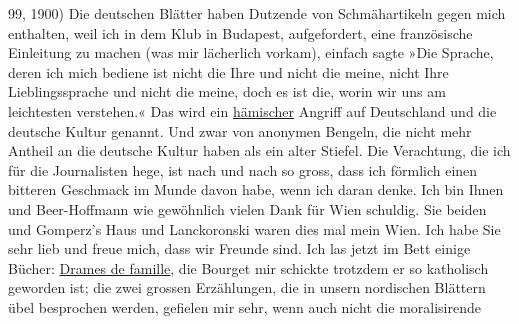 \begin{ledgroupsized}[t]{13cm}
                        99, 1900)\pend
           \pstart
           Die deutschen Blätter haben Dutzende von Schmähartikeln gegen mich enthalten,
                    weil ich in dem Klub
                        in Budapest, aufgefordert, eine französische Einleitung zu machen (was mir lächerlich vorkam),
                    einfach sagte »Die Sprache, deren ich mich bediene ist nicht die Ihre und nicht
                    die meine, nicht Ihre Lieblingssprache und nicht die meine, doch es ist die,
                    worin wir uns am leichtesten verstehen.« Das wird ein \uline{hämischer} Angriff auf Deutschland
                    und die deutsche Kultur genannt. Und zwar von anonymen Bengeln, die nicht mehr
                    Antheil an die deutsche Kultur haben als ein alter Stiefel. Die Verachtung, die ich für die Journalisten {\pb}hege, ist nach und nach so
                    gross, dass ich förmlich einen bitteren Geschmack im Munde davon habe, wenn ich
                    daran denke.\pend
           \pstart
           Ich bin Ihnen und Beer-Hoffmann wie
                    gewöhnlich vielen Dank für Wien
               schuldig.\pend
           \pstart
           Sie beiden und Gomperz’s Haus und Lanckoronski waren dies mal mein Wien. Ich habe Sie sehr lieb und freue mich,
                    dass wir Freunde sind.\pend
           \pstart
           Ich las jetzt im Bett einige Bücher: \uline{Drames de famille}, die Bourget mir schickte trotzdem
                    er so katholisch geworden ist; die zwei grossen Erzählungen, die in unsern nordischen Blättern übel
                    besprochen werden, gefielen mir sehr, wenn auch nicht die moralisirende

\end{ledgroupsized}
